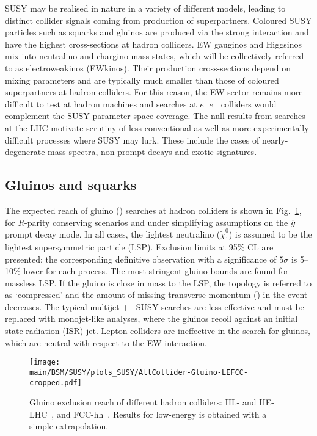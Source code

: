 \documentclass[../report.tex]{subfiles}
\providecommand{\main}{..}
\begin{document}
SUSY may be realised in nature in a variety of different models, leading to distinct collider signals coming from production of superpartners. Coloured SUSY particles such as squarks and gluinos are produced via the strong interaction and have the highest cross-sections at hadron colliders. EW gauginos and Higgsinos mix into neutralino and chargino mass states, which will be collectively referred to as electroweakinos (EWkinos). Their production cross-sections depend on mixing parameters and are typically much smaller than those of coloured superpartners at hadron colliders. 
For this reason, the EW sector remains more difficult to test at hadron machines and searches at $e^{+}e^{-}$ colliders would complement the SUSY parameter space coverage. The null results from searches at the LHC motivate scrutiny of less conventional as well as more experimentally difficult processes where SUSY may lurk. These include the cases of nearly-degenerate mass spectra, non-prompt decays and exotic signatures.

\subsection{Gluinos and squarks} 
The expected reach of gluino (\gl) searches at hadron colliders is shown in Fig.~\ref{fig:SUSY_gluino}, for $R$-parity conserving scenarios and under simplifying assumptions on the $\tilde{g}$ prompt decay mode.  In all cases, the lightest neutralino ($\tilde \chi_1^0$) is assumed to be the lightest supersymmetric particle (LSP). Exclusion limits at 95\% CL are presented; the corresponding definitive observation with a significance of $5\sigma$ is 5--10\% lower for each process. The most stringent gluino bounds are found for massless LSP. If the gluino is close in mass to the LSP, the topology is referred to as `compressed' and the amount of missing transverse momentum (\Ptmiss) in the event decreases. The typical multijet + \Ptmiss~SUSY searches are less effective and must be replaced with monojet-like analyses, where the gluinos recoil against an initial state radiation (ISR) jet. Lepton colliders are ineffective in the search for gluinos, which are neutral with respect to the EW interaction.

\begin{figure}[htb]
    \centering
\texttt{[image: \\main/BSM/SUSY/plots\_SUSY/AllCollider-Gluino-LEFCC-cropped.pdf]}
    \caption{
    Gluino exclusion reach of different hadron colliders: HL- and HE-LHC~\cite{CidVidal:2018eel}, and FCC-hh~\cite{Golling:2016gvc, Abada:2019lih}. Results for low-energy \FCChh is obtained with a simple extrapolation.
    }
\label{fig:SUSY_gluino}
\end{figure}
\end{document}
